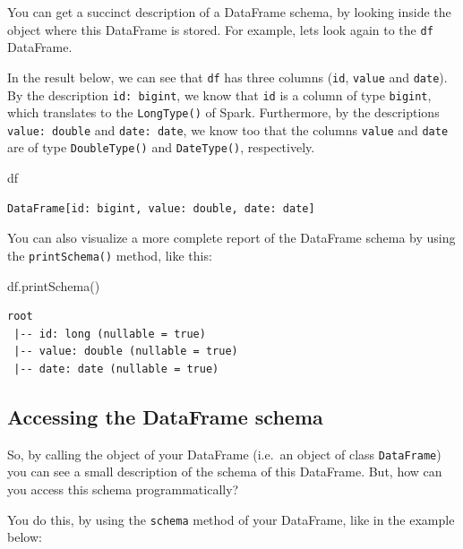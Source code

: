 \documentclass[
  11pt,
  letterpaper,
  DIV=11,
  numbers=noendperiod]{scrreprt}
\newenvironment{Shaded}{\begin{snugshade}}{\end{snugshade}}
\newcommand{\NormalTok}[1]{\textcolor[rgb]{0.00,0.23,0.31}{#1}}
\begin{document}
You can get a succinct description of a DataFrame schema, by looking
inside the object where this DataFrame is stored. For example, lets look
again to the \texttt{df} DataFrame.

In the result below, we can see that \texttt{df} has three columns
(\texttt{id}, \texttt{value} and \texttt{date}). By the description
\texttt{id:\ bigint}, we know that \texttt{id} is a column of type
\texttt{bigint}, which translates to the \texttt{LongType()} of Spark.
Furthermore, by the descriptions \texttt{value:\ double} and
\texttt{date:\ date}, we know too that the columns \texttt{value} and
\texttt{date} are of type \texttt{DoubleType()} and \texttt{DateType()},
respectively.

\begin{Shaded}
\begin{Highlighting}[]
\NormalTok{df}
\end{Highlighting}
\end{Shaded}

\begin{verbatim}
DataFrame[id: bigint, value: double, date: date]
\end{verbatim}

You can also visualize a more complete report of the DataFrame schema by
using the \texttt{printSchema()} method, like this:

\begin{Shaded}
\begin{Highlighting}[]
\NormalTok{df.printSchema()}
\end{Highlighting}
\end{Shaded}

\begin{verbatim}
root
 |-- id: long (nullable = true)
 |-- value: double (nullable = true)
 |-- date: date (nullable = true)
\end{verbatim}

\hypertarget{accessing-the-dataframe-schema}{%
\subsection{Accessing the DataFrame
schema}\label{accessing-the-dataframe-schema}}

So, by calling the object of your DataFrame (i.e.~an object of class
\texttt{DataFrame}) you can see a small description of the schema of
this DataFrame. But, how can you access this schema programmatically?

You do this, by using the \texttt{schema} method of your DataFrame, like
in the example below:
\end{document}
